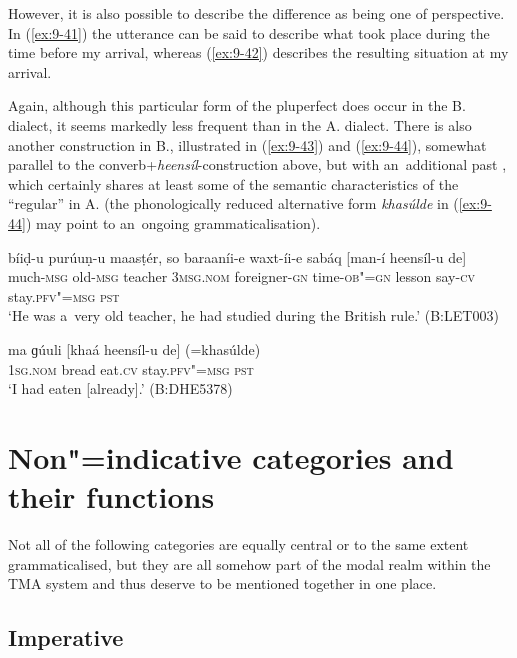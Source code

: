 However, it is also possible to describe the difference as being one of perspective. In (\ref{ex:9-41}) the utterance can be said to describe what took place during the time before my arrival, whereas (\ref{ex:9-42}) describes the resulting situation at my arrival.


Again, although this particular form of the pluperfect does occur in the B. dialect, it seems markedly less frequent than in the A. dialect. There is also another construction in B., illustrated in (\ref{ex:9-43}) and (\ref{ex:9-44}), somewhat parallel to the converb+\textit{heensíl}-construction above, but with an~additional past  , which certainly shares at least some of the semantic characteristics of the ``regular''  in A. (the phonologically reduced alternative form \textit{khasúlde} in (\ref{ex:9-44}) may point to an~ongoing grammaticalisation).

\begin{exe}
\ex
\label{ex:9-43}
\gll bíiḍ-u purúuṇ-u maasṭér, so baraaníi-e waxt-íi-e sabáq [man-í heensíl-u de] \\
much-\textsc{msg} old-\textsc{msg} teacher 3\textsc{msg.nom}  foreigner-\textsc{gn}
time-\textsc{ob"=gn} lesson say-\textsc{cv} stay.\textsc{pfv"=msg} \textsc{pst} \\
\glt `He was a~very old teacher, he had studied during the British rule.' (B:LET003)

\ex
\label{ex:9-44}
\gll ma ɡúuli [khaá heensíl-u de] (=khasúlde) \\
\textsc{1sg.nom} bread eat.\textsc{cv} stay.\textsc{pfv"=msg} \textsc{pst}  \\
\glt `I had eaten [already].' (B:DHE5378)
\end{exe}

\section{Non"=indicative  categories and their functions}
\label{sec:9-2}


Not all of the following categories are equally central or to the same extent grammaticalised, but they are all somehow part of the modal realm within the TMA system and thus deserve to be mentioned together in one place.


\subsection{Imperative}
\label{subsec:9-2-1}

